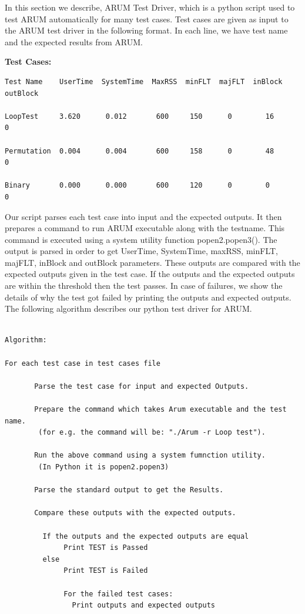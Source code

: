 \documentclass[11pt,letterpaper,oneside]{article}
\begin{document}
In this section we describe, ARUM Test Driver, which is a python script used to test ARUM automatically for many test cases. Test cases are given as input to the ARUM test driver in the following format. In each line, we have test name and the expected results from ARUM.\newline

{\bf Test Cases:}

\begin{verbatim}
Test Name    UserTime  SystemTime  MaxRSS  minFLT  majFLT  inBlock  outBlock

LoopTest     3.620      0.012       600     150      0        16       0

Permutation  0.004      0.004       600     158      0        48       0

Binary       0.000      0.000       600     120      0        0        0

\end{verbatim}

Our script parses each test case into input and the expected outputs. It then prepares a command to run ARUM executable along with the testname. This command is executed using a system utility function popen2.popen3(). The output is parsed in order to get UserTime, SystemTime, maxRSS, minFLT, majFLT, inBlock and outBlock parameters. These outputs are compared with the expected outputs given in the test case. If the outputs and the expected outputs are within the threshold then the test passes. In case of failures, we show the details of why the test got failed by printing the outputs and expected outputs. The following algorithm describes our python test driver for ARUM.\newline

\begin{verbatim}

Algorithm:

For each test case in test cases file

       Parse the test case for input and expected Outputs.
     
       Prepare the command which takes Arum executable and the test name.
        (for e.g. the command will be: "./Arum -r Loop test").
       
       Run the above command using a system fumnction utility.
        (In Python it is popen2.popen3)

       Parse the standard output to get the Results.

       Compare these outputs with the expected outputs.
       
         If the outputs and the expected outputs are equal
              Print TEST is Passed
         else 
              Print TEST is Failed

              For the failed test cases:
                Print outputs and expected outputs
\end{verbatim}
\end{document}
